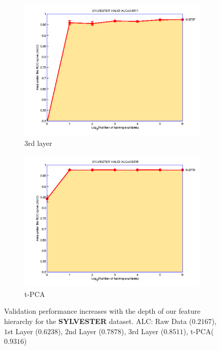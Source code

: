 \begin{figure}
\begin{subfigure}{.3\textwidth}
\centering
\includegraphics[height=0.15\textheight,keepaspectratio]{article1/images/syl2.pdf}
\caption{3rd layer}
\end{subfigure}
\begin{subfigure}{.3\textwidth}
\centering
\includegraphics[height=0.15\textheight,keepaspectratio]{article1/images/syl3.pdf}
\caption{t-PCA}
\end{subfigure}
\caption[ALC versus Depth]{Validation performance increases with the depth of our feature
hierarchy for the {\bf SYLVESTER} dataset. ALC: Raw Data ($0.2167$), $1$st
Layer ($0.6238$), $2$nd Layer ($0.7878$), $3$rd Layer ($0.8511$),
t-PCA($0.9316$)}
\label{fig:sylvester}
\end{figure}




